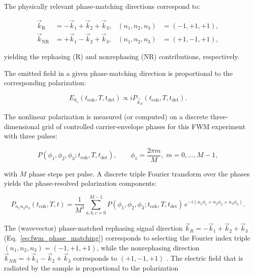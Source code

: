 \noindent 
The physically relevant phase-matching directions correspond to:

\begin{align}
	\vec{k}_{\mathrm{R}}  & = -\vec{k}_1 + \vec{k}_2 + \vec{k}_3,
	                      & (n_1,n_2,n_3)                         & = (-1,+1,+1), \label{eq:rephasing_selection}    \\
	\vec{k}_{\mathrm{NR}} & = +\vec{k}_1 - \vec{k}_2 + \vec{k}_3,
	                      & (n_1,n_2,n_3)                         & = (+1,-1,+1), \label{eq:nonrephasing_selection}
\end{align}

\noindent 
yielding the rephasing (R) and nonrephasing (NR) contributions, respectively.

\noindent 
The emitted field in a given phase-matching direction is proportional to the corresponding polarization:

\begin{equation}
	E_{k_s}(t_{\text{coh}},T,t_{\text{det}}) \propto i P_{\vec{k}_S}(t_{\text{coh}},T,t_{\text{det}}).
	\label{eq:field_polarization_relation}
\end{equation}

\noindent 
The nonlinear polarization is measured (or computed) on a discrete three-dimensional grid of controlled carrier-envelope phases for this FWM experiment with three pulses:

\begin{equation}
	P(\phi_{1}, \phi_{2}, \phi_{3}; t_{\text{coh}}, T, t_{\text{det}}), \qquad
	\phi_{1} = \frac{2\pi m}{M}, \; m=0,\dots,M-1,
	\label{eq:phase_grid_definition}
\end{equation}

\noindent 
with $M$ phase steps per pulse. A discrete triple Fourier transform over the phases yields the phase-resolved polarization components:

\begin{equation}
	P_{n_1 n_2 n_3}(t_{\text{coh}}, T, t)
	=
	\frac{1}{M^{3}}
	\sum_{a,b,c=0}^{M-1}
	P(\phi_{1}, \phi_{2}, \phi_{3}; t_{\text{coh}}, T, t_{\text{det}})\,
	e^{-i ( n_1 \phi_{1} + n_2 \phi_{2} + n_3 \phi_{3} )}.
	\label{eq:dft_phase_cycling}
\end{equation}

\noindent 
The (wavevector) phase-matched rephasing signal direction $\vec{k}_R = -\vec{k}_1 + \vec{k}_2 + \vec{k}_3$ (Eq.~\eqref{eq:fwm_phase_matching}) corresponds to selecting the Fourier index triple $(n_1,n_2,n_3)=(-1,+1,+1)$, while the nonrephasing direction $\vec{k}_{NR} = +\vec{k}_1 - \vec{k}_2 + \vec{k}_3$ corresponds to $(+1,-1,+1)$ \cite{mukamel1995principlesnonlinearoptical, cho2009twodimensionalopticalspectroscopy, greenetal2024vibrationalcoherenceshalfbroadband}. The electric field that is radiated by the sample is proportional to the polarization


